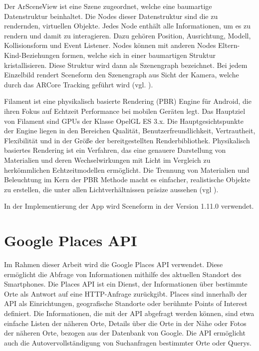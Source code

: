 Der ArSceneView ist eine Szene zugeordnet, welche eine baumartige Datenstruktur beinhaltet. Die Nodes dieser Datenstruktur sind die zu rendernden, virtuellen Objekte. Jedes Node enthält alle Informationen, um es zu rendern und damit zu interagieren. Dazu gehören Position, Ausrichtung, Modell, Kollisionsform und Event Listener. Nodes können mit anderen Nodes Eltern-Kind-Beziehungen formen, welche sich in einer baumartigen Struktur kristallisieren. Diese Struktur wird dann als Szenengraph bezeichnet. Bei jedem Einzelbild rendert Sceneform den Szenengraph aus Sicht der Kamera, welche durch das ARCore Tracking geführt wird (vgl. \cite{sceneform_google}). 

Filament ist eine physikalisch basierte Rendering (PBR) Engine für Android, die ihren Fokus auf Echtzeit Performance bei mobilen Geräten legt. Das Hauptziel von Filament sind GPUs der Klasse OpelGL ES 3.x. Die Hauptgesichtspunkte der Engine liegen in den Bereichen Qualität, Benutzerfreundlichkeit, Vertrautheit, Flexibilität und in der Größe der bereitgestellten Renderbibliothek. Physikalisch basiertes Rendering ist ein Verfahren, das eine genauere Darstellung von Materialien und deren Wechselwirkungen mit Licht im Vergleich zu herkömmlichen Echtzeitmodellen ermöglicht. Die Trennung von Materialien und Beleuchtung im Kern der PBR Methode macht es einfacher, realistische Objekte zu erstellen, die unter allen Lichtverhältnissen präsize aussehen (vgl \cite{filament}). 

In der Implementierung der App wird Sceneform in der Version 1.11.0 verwendet.


\section{Google Places API}

Im Rahmen dieser Arbeit wird die Google Places API verwendet. Diese ermöglicht die Abfrage von Informationen mithilfe des aktuellen Standort des Smartphones. Die Places API ist ein Dienst, der Informationen über bestimmte Orte als Antwort auf eine HTTP-Anfrage zurückgibt. Places sind innerhalb der API als Einrichtungen, geografische Standorte oder berühmte Points of Interest definiert. Die Informationen, die mit der API abgefragt werden können, sind etwa einfache Listen der näheren Orte, Details über die Orte in der Nähe oder Fotos der näheren Orte, bezogen aus der Datenbank von Google. Die API ermöglicht auch die  Autovervollständigung von Suchanfragen bestimmter Orte oder Querys. 


